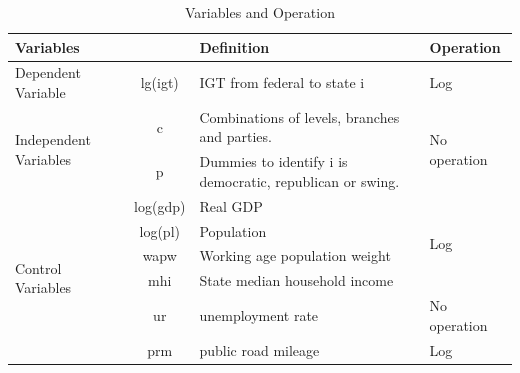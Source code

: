 \documentclass[man]{apa7}
\begin{document}
\begin{table}
  \centering
  \caption{Variables and Operation}
  \begin{tabular}{lcp{12.715em}p{6.145em}}
    \toprule
    \multicolumn{2}{p{9.93em}}{Variables }                        & Definition & Operation                                                                                    \\
    \midrule
    \multicolumn{1}{p{4.715em}}{Dependent Variable}               & lg(igt)    & IGT from federal to state i                               & Log                              \\
    \midrule
    \multicolumn{1}{l}{\multirow{2}[4]{*}{Independent Variables}} & c          & Combinations of levels, branches and parties.             & \multirow{2}[4]{*}{No operation} \\
    \cmidrule{2-3}                                                & p          & Dummies to identify i is democratic, republican or swing. & \multicolumn{1}{c}{}             \\
    \midrule
    \multicolumn{1}{l}{\multirow{6}[12]{*}{Control Variables}}    & log(gdp)   & \multicolumn{1}{l}{Real GDP}                              & \multirow{4}[8]{*}{Log }         \\
    \cmidrule{2-3}                                                & log(pl)    & \multicolumn{1}{l}{Population }                           & \multicolumn{1}{c}{}             \\
    \cmidrule{2-3}                                                & wapw       & Working age population weight                             & \multicolumn{1}{c}{}             \\
    \cmidrule{2-3}                                                & mhi        & State median household income                             & \multicolumn{1}{c}{}             \\
    \cmidrule{2-4}                                                & ur         & unemployment rate                                         & No operation                     \\
    \cmidrule{2-4}                                                & prm        & public road mileage                                       & Log                              \\
    \bottomrule
  \end{tabular}%
  \label{Table 2.5}%
\end{table}%
\end{document}
